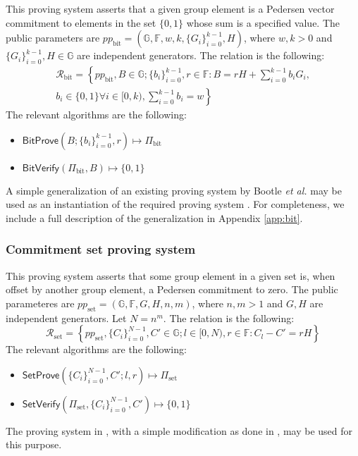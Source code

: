 \documentclass{llncs}
\newcommand{\G}{\mathbb{G}}
\newcommand{\F}{\mathbb{F}}
\newcommand{\func}[1]{\mathsf{#1}}
\begin{document}
This proving system asserts that a given group element is a Pedersen vector commitment to elements in the set $\{0,1\}$ whose sum is a specified value.
The public parameters are $pp_{\text{bit}} = \left( \G, \F, w, k, \{G_i\}_{i=0}^{k-1}, H \right)$, where $w, k > 0$ and $\{G_i\}_{i=0}^{k-1}, H \in \G$ are independent generators.
The relation is the following:
\begin{multline*}
\mathcal{R}_{\text{bit}} = \left\{ pp_{\text{bit}}, B \in \G ; \{b_i\}_{i=0}^{k-1}, r \in \F : B = rH + \sum_{i=0}^{k-1} b_i G_i, \right. \\
\left. b_i \in \{0,1\} \forall i \in [0,k), \sum_{i=0}^{k-1} b_i = w \right\}
\end{multline*}
The relevant algorithms are the following:
\begin{itemize}
	\item $\func{BitProve}\left( B ; \{b_i\}_{i=0}^{k-1}, r \right) \mapsto \Pi_{\text{bit}}$
	\item $\func{BitVerify}\left( \Pi_{\text{bit}}, B \right) \mapsto \{0, 1\}$
\end{itemize}
A simple generalization of an existing proving system by Bootle \textit{et al.} may be used as an instantiation of the required proving system \cite{bootle}.
For completeness, we include a full description of the generalization in Appendix \ref{app:bit}.


\subsubsection{Commitment set proving system}

This proving system asserts that some group element in a given set is, when offset by another group element, a Pedersen commitment to zero.
The public parameteres are $pp_{\text{set}} = (\G, \F, G, H, n, m)$, where $n, m > 1$ and $G, H$ are independent generators.
Let $N = n^m$.
The relation is the following:
\[ \mathcal{R}_{\text{set}} = \left\{ pp_{\text{set}}, \{C_i\}_{i=0}^{N-1}, C' \in \G ; l \in [0,N), r \in \F : C_l - C' = rH \right\} \]
The relevant algorithms are the following:
\begin{itemize}
	\item $\func{SetProve}\left( \{C_i\}_{i=0}^{N-1}, C' ; l, r \right) \mapsto \Pi_{\text{set}}$
	\item $\func{SetVerify}\left( \Pi_{\text{set}}, \{C_i\}_{i=0}^{N-1}, C' \right) \mapsto \{0, 1\}$
\end{itemize}
The proving system in \cite{bootle}, with a simple modification as done in \cite{spark}, may be used for this purpose.
\end{document}
